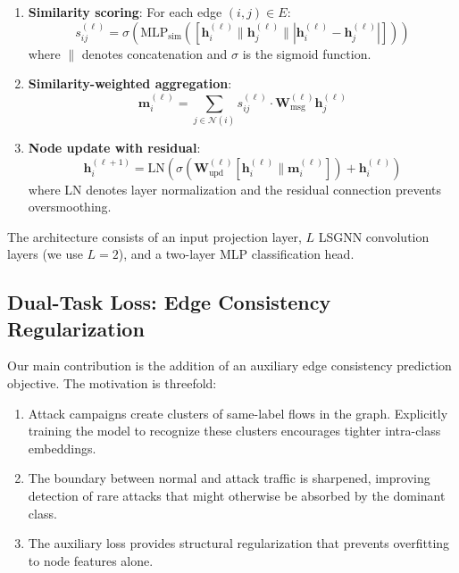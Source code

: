 \documentclass[conference]{IEEEtran}
\begin{document}
\begin{enumerate}
    \item \textbf{Similarity scoring}: For each edge $(i, j) \in E$:
    \begin{equation}
        s_{ij}^{(\ell)} = \sigma\!\left(\text{MLP}_{\text{sim}}\!\left([\mathbf{h}_i^{(\ell)} \| \mathbf{h}_j^{(\ell)} \| |\mathbf{h}_i^{(\ell)} - \mathbf{h}_j^{(\ell)}|]\right)\right)
    \end{equation}
    where $\|$ denotes concatenation and $\sigma$ is the sigmoid function.

    \item \textbf{Similarity-weighted aggregation}:
    \begin{equation}
        \mathbf{m}_i^{(\ell)} = \sum_{j \in \mathcal{N}(i)} s_{ij}^{(\ell)} \cdot \mathbf{W}_{\text{msg}}^{(\ell)} \mathbf{h}_j^{(\ell)}
    \end{equation}

    \item \textbf{Node update with residual}:
    \begin{equation}
        \mathbf{h}_i^{(\ell+1)} = \text{LN}\!\left(\sigma\!\left(\mathbf{W}_{\text{upd}}^{(\ell)} [\mathbf{h}_i^{(\ell)} \| \mathbf{m}_i^{(\ell)}]\right) + \mathbf{h}_i^{(\ell)}\right)
    \end{equation}
    where LN denotes layer normalization and the residual connection prevents oversmoothing.
\end{enumerate}

The architecture consists of an input projection layer, $L$ LSGNN convolution layers (we use $L=2$), and a two-layer MLP classification head.

\subsection{Dual-Task Loss: Edge Consistency Regularization}

Our main contribution is the addition of an auxiliary edge consistency prediction objective. The motivation is threefold:

\begin{enumerate}
    \item Attack campaigns create clusters of same-label flows in the graph. Explicitly training the model to recognize these clusters encourages tighter intra-class embeddings.
    \item The boundary between normal and attack traffic is sharpened, improving detection of rare attacks that might otherwise be absorbed by the dominant class.
    \item The auxiliary loss provides structural regularization that prevents overfitting to node features alone.
\end{enumerate}
\end{document}
